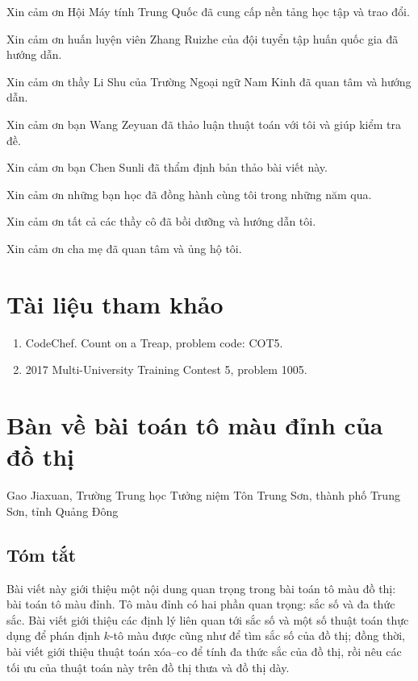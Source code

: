 \documentclass[11pt]{article}
\begin{document}
Xin cảm ơn Hội Máy tính Trung Quốc đã cung cấp nền tảng học tập và trao đổi.

Xin cảm ơn huấn luyện viên Zhang Ruizhe của đội tuyển tập huấn quốc gia đã
hướng dẫn.

Xin cảm ơn thầy Li Shu của Trường Ngoại ngữ Nam Kinh đã quan tâm và hướng
dẫn.

Xin cảm ơn bạn Wang Zeyuan đã thảo luận thuật toán với tôi và giúp kiểm tra
đề.

Xin cảm ơn bạn Chen Sunli đã thẩm định bản thảo bài viết này.

Xin cảm ơn những bạn học đã đồng hành cùng tôi trong những năm qua.

Xin cảm ơn tất cả các thầy cô đã bồi dưỡng và hướng dẫn tôi.

Xin cảm ơn cha mẹ đã quan tâm và ủng hộ tôi.

\section*{Tài liệu tham khảo}

\begin{enumerate}
  \item CodeChef. Count on a Treap, problem code: COT5.
  \item 2017 Multi-University Training Contest 5, problem 1005.
\end{enumerate}

\clearpage
\section*{Bàn về bài toán tô màu đỉnh của đồ thị}

\begin{center}
Gao Jiaxuan, Trường Trung học Tưởng niệm Tôn Trung Sơn, thành phố Trung Sơn,
tỉnh Quảng Đông
\end{center}

\subsection*{Tóm tắt}

Bài viết này giới thiệu một nội dung quan trọng trong bài toán tô màu đồ thị:
bài toán tô màu đỉnh. Tô màu đỉnh có hai phần quan trọng: sắc số và đa thức
sắc. Bài viết giới thiệu các định lý liên quan tới sắc số và một số thuật toán
thực dụng để phán định \(k\)-tô màu được cũng như để tìm sắc số của đồ thị;
đồng thời, bài viết giới thiệu thuật toán xóa--co để tính đa thức sắc của đồ
thị, rồi nêu các tối ưu của thuật toán này trên đồ thị thưa và đồ thị dày.
\end{document}
